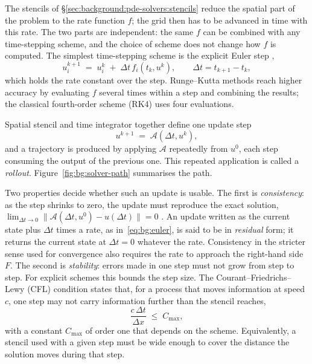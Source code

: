 The stencils of \S\ref{sec:background:pde-solvers:stencils} reduce the
spatial part of the problem to the rate function $f$; the grid then has
to be advanced in time with this rate.
The two parts are independent: the same $f$ can be combined with any
time-stepping scheme, and the choice of scheme does not change how $f$
is computed.
The simplest time-stepping scheme is the explicit Euler step \citep{Butcher1987, Hairer1993},
\begin{equation}
  u_i^{k + 1} \;=\; u_i^{k}
  \;+\; \Delta t \, f_i\!\left(t_k, u^{k}\right),
  \qquad \Delta t = t_{k+1} - t_k ,
  \label{eq:bg:euler}
\end{equation}
which holds the rate constant over the step. Runge--Kutta methods reach
higher accuracy by evaluating $f$ several times within a step and
combining the results; the classical fourth-order scheme (RK4) uses four
evaluations.

Spatial stencil and time integrator together define one update step
\begin{equation}
  u^{k+1} \;=\; \mathcal{A}\!\left(\Delta t, u^{k}\right),
  \label{eq:bg:update-operator}
\end{equation}
and a trajectory is produced by applying $\mathcal{A}$ repeatedly from
$u^{0}$, each step consuming the output of the previous one. This
repeated application is called a \emph{rollout}.
Figure~\ref{fig:bg:solver-path} summarises the path.

Two properties decide whether such an update is usable. The first is
\emph{consistency}: as the step shrinks to zero, the update must
reproduce the exact solution,
$\lim_{\Delta t \to 0} \lVert \mathcal{A}(\Delta t, u^{0}) - u(\Delta t) \rVert = 0$
\citep{Brandstetter2022}. An update written as the current state plus
$\Delta t$ times a rate, as in~\eqref{eq:bg:euler}, is said to be in
\emph{residual} form; it returns the current state at $\Delta t = 0$
whatever the rate. Consistency in the stricter sense used for
convergence also requires the rate to approach the right-hand side $F$. The second is \emph{stability}: errors made in one
step must not grow from step to step. For explicit schemes this bounds
the step size.
The Courant--Friedrichs--Lewy (CFL) condition \citep{Courant1928}
states that, for a process that moves information at speed $c$, one
step may not carry information further than the stencil reaches,
\begin{equation}
  \frac{c \, \Delta t}{\Delta x} \;\leq\; C_{\max},
  \label{eq:bg:cfl}
\end{equation}
with a constant $C_{\max}$ of order one that depends on the scheme.
Equivalently, a stencil used with a given step must be wide
enough to cover the distance the solution moves during that step.

